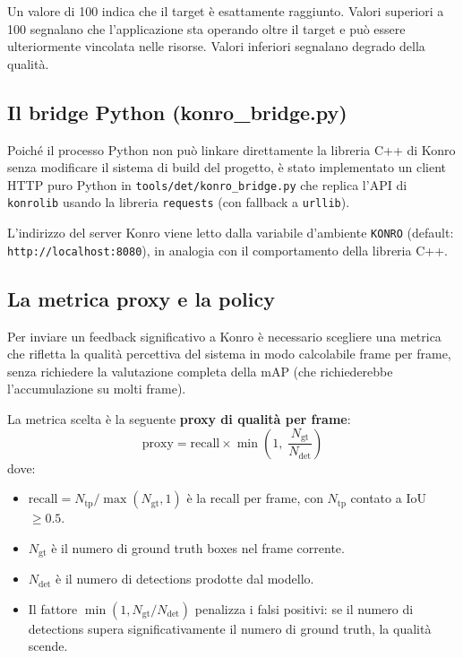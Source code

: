 \documentclass[12pt,a4paper]{article}
\begin{document}
Un valore di 100 indica che il target \`e esattamente raggiunto. Valori superiori a 100
segnalano che l'applicazione sta operando oltre il target e pu\`o essere ulteriormente
vincolata nelle risorse. Valori inferiori segnalano degrado della qualit\`a.

\subsection{Il bridge Python (konro\_bridge.py)}

Poich\'e il processo Python non pu\`o linkare direttamente la libreria C++ di Konro
senza modificare il sistema di build del progetto, \`e stato implementato un client HTTP
puro Python in \texttt{tools/det/konro\_bridge.py} che replica l'API di \texttt{konrolib}
usando la libreria \texttt{requests} (con fallback a \texttt{urllib}).

L'indirizzo del server Konro viene letto dalla variabile d'ambiente \texttt{KONRO}
(default: \texttt{http://localhost:8080}), in analogia con il comportamento della
libreria C++.

\subsection{La metrica proxy e la policy}

Per inviare un feedback significativo a Konro \`e necessario scegliere una metrica che
rifletta la qualit\`a percettiva del sistema in modo calcolabile frame per frame, senza
richiedere la valutazione completa della mAP (che richiederebbe l'accumulazione su
molti frame).

La metrica scelta \`e la seguente \textbf{proxy di qualit\`a per frame}:
\begin{equation}
  \text{proxy} = \text{recall} \times \min\!\left(1,\; \frac{N_\text{gt}}{N_\text{det}}\right)
\end{equation}
dove:
\begin{itemize}
  \item $\text{recall} = N_\text{tp} / \max(N_\text{gt}, 1)$ \`e la recall per frame,
        con $N_\text{tp}$ contato a IoU $\ge 0.5$.
  \item $N_\text{gt}$ \`e il numero di ground truth boxes nel frame corrente.
  \item $N_\text{det}$ \`e il numero di detections prodotte dal modello.
  \item Il fattore $\min(1, N_\text{gt}/N_\text{det})$ penalizza i falsi positivi:
        se il numero di detections supera significativamente il numero di ground truth,
        la qualit\`a scende.
\end{itemize}
\end{document}
